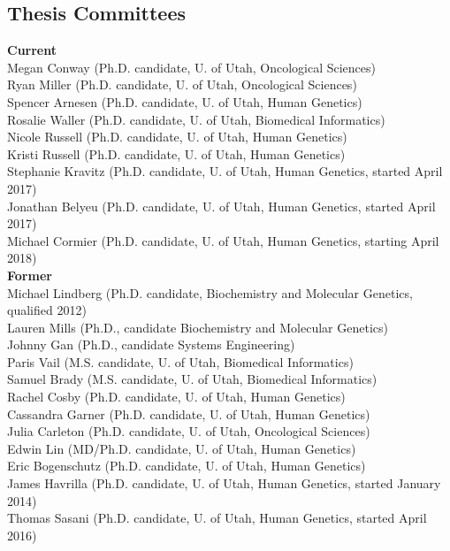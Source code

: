 \documentclass[margin,line]{cv}
\begin{document}
\begin{resume}


    \section{\mysidestyle Thesis Committees}
    
    \textbf{Current}\\
    Megan Conway (Ph.D. candidate, U. of Utah, Oncological Sciences)\\
    Ryan Miller (Ph.D. candidate, U. of Utah, Oncological Sciences)\\
    Spencer Arnesen (Ph.D. candidate, U. of Utah, Human Genetics)\\
    Rosalie Waller (Ph.D. candidate, U. of Utah, Biomedical Informatics)\\
    Nicole Russell (Ph.D. candidate, U. of Utah, Human Genetics)\\
    Kristi Russell (Ph.D. candidate, U. of Utah, Human Genetics)\\
    Stephanie Kravitz (Ph.D. candidate, U. of Utah, Human Genetics, started April 2017) \\
    Jonathan Belyeu (Ph.D. candidate, U. of Utah, Human Genetics, started April 2017) \\
    Michael Cormier (Ph.D. candidate, U. of Utah, Human Genetics, starting April 2018) \\


    \textbf{Former} \\
    Michael Lindberg (Ph.D. candidate, Biochemistry and Molecular Genetics, qualified 2012)\\
    Lauren Mills (Ph.D., candidate Biochemistry and Molecular Genetics)\\
	Johnny Gan (Ph.D., candidate Systems Engineering) \\
    Paris Vail (M.S. candidate, U. of Utah, Biomedical Informatics) \\
    Samuel Brady (M.S. candidate, U. of Utah, Biomedical Informatics)\\
    Rachel Cosby (Ph.D. candidate, U. of Utah, Human Genetics)\\
    Cassandra Garner (Ph.D. candidate, U. of Utah, Human Genetics)\\
    Julia Carleton (Ph.D. candidate, U. of Utah, Oncological Sciences)\\
    Edwin Lin (MD/Ph.D. candidate, U. of Utah, Human Genetics)\\
    Eric Bogenschutz (Ph.D. candidate, U. of Utah, Human Genetics)\\
    James Havrilla (Ph.D. candidate, U. of Utah, Human Genetics, started January 2014) \\
    Thomas Sasani (Ph.D. candidate, U. of Utah, Human Genetics, started April 2016) \\




\end{resume}
\end{document}

